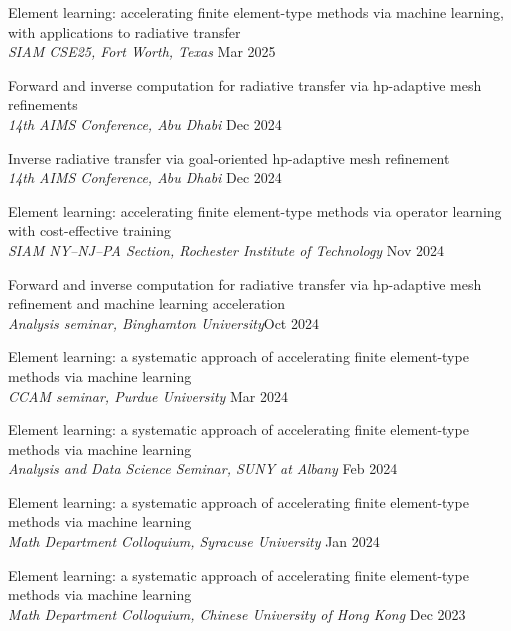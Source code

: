\documentclass[11pt]{res}
\newenvironment{cvenumerate}{\begin{etaremune}\itemsep -2pt}{\end{etaremune}\vspace{-5pt}}
\begin{document}
\begin{resume}
\begin{cvenumerate}
\item
Element learning: accelerating finite element-type
methods via machine learning, with applications to
radiative transfer\\
{\sl SIAM CSE25, Fort Worth, Texas}
\hfill Mar 2025

\item
Forward and inverse computation for radiative transfer
via hp-adaptive mesh refinements\\
{\sl 14th AIMS Conference, Abu Dhabi}
\hfill Dec 2024

\item
Inverse radiative transfer via goal-oriented hp-adaptive mesh refinement\\
{\sl 14th AIMS Conference, Abu Dhabi}
\hfill Dec 2024


\item Element learning: accelerating finite element-type methods via operator learning with cost-effective training\\
{\sl SIAM NY--NJ--PA Section, Rochester Institute of Technology}
\hfill Nov 2024

\item Forward and inverse computation for radiative transfer via hp-adaptive mesh refinement and machine learning acceleration\\
{\sl Analysis seminar, Binghamton University}\hfill Oct 2024

\item Element learning: a systematic approach of accelerating finite element-type methods via machine learning\\
{\sl CCAM seminar, Purdue University}
\hfill Mar 2024

\item
Element learning: a systematic approach of accelerating
finite element-type methods via machine learning\\
{\sl Analysis and Data Science Seminar, SUNY at Albany}
\hfill Feb 2024

\item
Element learning: a systematic approach of accelerating
finite element-type methods via machine learning\\
{\sl Math Department Colloquium, Syracuse University}
\hfill Jan 2024

\item
Element learning: a systematic approach of accelerating
finite element-type methods via machine learning\\
{\sl Math Department Colloquium, Chinese University of Hong Kong}
\hfill Dec 2023


\end{cvenumerate}
\end{resume}
\end{document}
